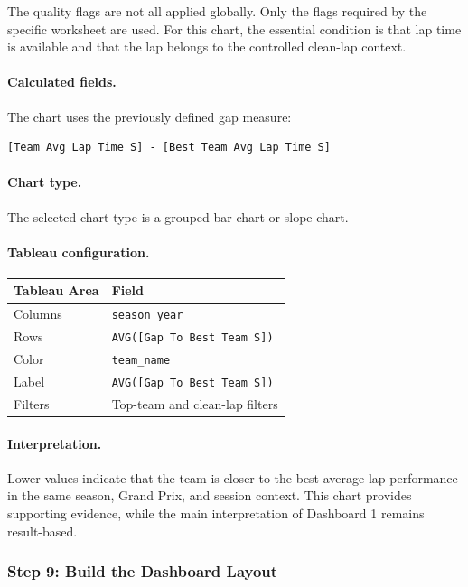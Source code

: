 \documentclass[12pt,a4paper]{article}
\begin{document}
	The quality flags are not all applied globally.
	Only the flags required by the specific worksheet are used.
	For this chart, the essential condition is that lap time is available and that the lap belongs to the controlled clean-lap context.
	
	\paragraph{Calculated fields.}
	The chart uses the previously defined gap measure:
	
	\begin{lstlisting}[basicstyle=\ttfamily\footnotesize]
		[Team Avg Lap Time S] - [Best Team Avg Lap Time S]
	\end{lstlisting}
	
	\paragraph{Chart type.}
	The selected chart type is a grouped bar chart or slope chart.
	
	\paragraph{Tableau configuration.}
	
	\begin{longtable}{p{5cm} p{8cm}}
		\toprule
		\textbf{Tableau Area} & \textbf{Field} \\
		\midrule
		Columns & \texttt{season\_year} \\
		Rows & \texttt{AVG([Gap To Best Team S])} \\
		Color & \texttt{team\_name} \\
		Label & \texttt{AVG([Gap To Best Team S])} \\
		Filters & Top-team and clean-lap filters \\
		\bottomrule
	\end{longtable}
	
	\paragraph{Interpretation.}
	Lower values indicate that the team is closer to the best average lap performance in the same season, Grand Prix, and session context.
	This chart provides supporting evidence, while the main interpretation of Dashboard 1 remains result-based.
	
	\subsubsection{Step 9: Build the Dashboard Layout}
	
\end{document}
